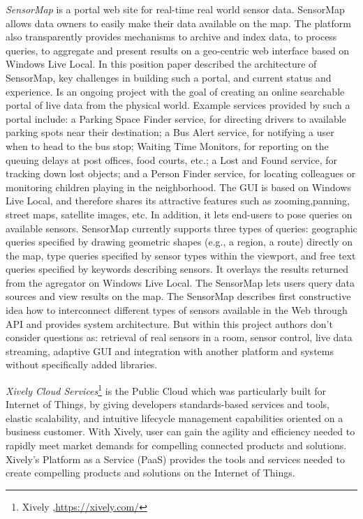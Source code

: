     \emph{SensorMap}\cite{nath2006challenges} is a portal web site for real-time real world sensor data. SensorMap allows data owners to easily make their data available on the map. The platform also transparently provides mechanisms to archive and index data, to process queries, to aggregate and present results on a geo-centric web interface based on Windows Live Local. In this position paper  described the architecture of SensorMap, key challenges in building such a portal, and current status and experience. Is an ongoing project with the goal of creating an online searchable portal of live data from the physical world. Example services provided by such a portal include: a Parking Space Finder service, for directing drivers to available parking spots near their destination; a Bus Alert service, for notifying a user when to head to the bus stop; Waiting Time Monitors, for reporting on the queuing delays at post offices, food courts, etc.; a Lost and Found service, for tracking down lost objects; and a Person Finder service, for locating colleagues or monitoring children playing in the neighborhood. The GUI is based on Windows Live Local, and therefore shares its attractive features such as zooming,panning, street maps, satellite images, etc. In addition, it lets end-users to pose queries on available sensors. SensorMap currently supports three types of queries: geographic queries specified by drawing geometric shapes (e.g., a region, a route) directly on the map, type queries specified by sensor types within the viewport, and free text queries specified by keywords describing sensors. It overlays the results returned from the agregator on Windows Live Local. The SensorMap lets users query data sources and view results on the map. The SensorMap describes first constructive idea how to interconnect different types of sensors available in the Web through API and provides system architecture. But within this project authors don't consider questions as: retrieval of real sensors in a room, sensor control, live data streaming, adaptive GUI and integration with another platform and systems without specifically added libraries. 

    \emph{Xively Cloud Services}\footnote{Xively ,\url{https://xively.com/}} is the Public Cloud which was particularly built for Internet of Things, by giving developers standards-based services and tools, elastic scalability, and intuitive lifecycle management capabilities oriented on a business customer. With Xively, user can gain the agility and efficiency needed to rapidly meet market demands for compelling connected products and solutions. Xively's Platform as a Service (PaaS) provides the tools and services needed to create compelling products and solutions on the Internet of Things.

